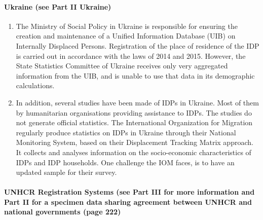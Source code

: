 \documentclass[
]{article}
\begin{document}
\hypertarget{ukraine-see-part-ii-ukraine-1}{%
\paragraph{Ukraine (see Part II Ukraine)}\label{ukraine-see-part-ii-ukraine-1}}

\begin{enumerate}
\def\labelenumi{\arabic{enumi}.}
\setcounter{enumi}{183}
\item
  The Ministry of Social Policy in Ukraine is responsible for
  ensuring the creation and maintenance of a Unified Information
  Database (UIB) on Internally Displaced Persons. Registration of the
  place of residence of the IDP is carried out in accordance with the
  laws of 2014 and 2015. However, the State Statistics Committee of
  Ukraine receives only very aggregated information from the UIB, and
  is unable to use that data in its demographic calculations.
\item
  In addition, several studies have been made of IDPs in Ukraine.
  Most of them by humanitarian organisations providing assistance to
  IDPs. The studies do not generate official statistics. The
  International Organization for Migration regularly produce
  statistics on IDPs in Ukraine through their National Monitoring
  System, based on their Displacement Tracking Matrix approach. It
  collects and analyses information on the socio-economic
  characteristics of IDPs and IDP households. One challenge the IOM
  faces, is to have an updated sample for their survey.
\end{enumerate}

\hypertarget{unhcr-registration-systems-see-part-iii-for-more-information-and-part-ii-for-a-specimen-data-sharing-agreement-between-unhcr-and-national-governments-page-222-1}{%
\paragraph{UNHCR Registration Systems (see Part III for more information and Part II for a specimen data sharing agreement between UNHCR and national governments (page 222)}\label{unhcr-registration-systems-see-part-iii-for-more-information-and-part-ii-for-a-specimen-data-sharing-agreement-between-unhcr-and-national-governments-page-222-1}}
\end{document}

